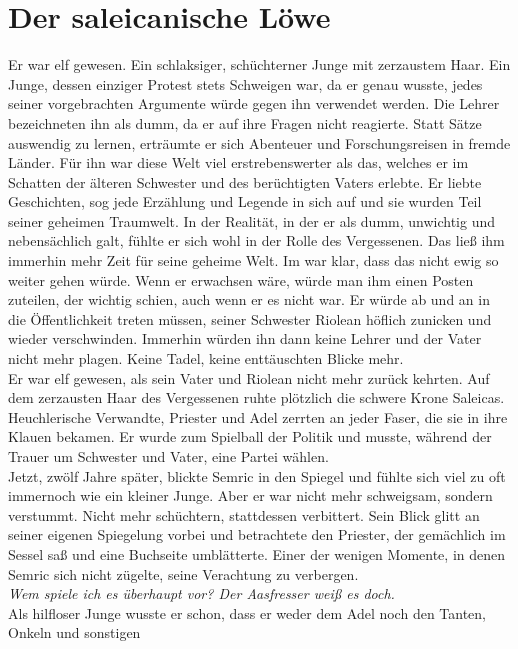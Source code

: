 
\chapter{Der saleicanische Löwe}
Er war elf gewesen. Ein schlaksiger, schüchterner Junge mit zerzaustem Haar. Ein Junge, dessen 
einziger Protest stets Schweigen war, da er genau wusste, jedes seiner vorgebrachten Argumente würde 
gegen ihn verwendet werden. Die Lehrer bezeichneten ihn als dumm, da er auf ihre Fragen nicht 
reagierte. Statt Sätze auswendig zu lernen, erträumte er sich Abenteuer und Forschungsreisen in 
fremde Länder. Für ihn war diese Welt viel erstrebenswerter als das, welches er im Schatten der 
älteren Schwester und des berüchtigten Vaters erlebte. Er liebte Geschichten, sog jede Erzählung und 
Legende in sich auf und sie wurden Teil seiner geheimen Traumwelt. In der Realität, in der er als 
dumm, unwichtig und nebensächlich galt, fühlte er sich wohl in der Rolle des Vergessenen. Das ließ 
ihm immerhin mehr Zeit für seine geheime Welt. Im war klar, dass das nicht ewig so weiter gehen 
würde. Wenn er erwachsen wäre, würde man ihm einen Posten zuteilen, der wichtig schien, auch wenn er 
es nicht war. Er würde ab und an in die Öffentlichkeit treten müssen, seiner Schwester Riolean 
höflich zunicken und wieder verschwinden. Immerhin würden ihn dann keine Lehrer und der Vater nicht 
mehr plagen. Keine Tadel, keine enttäuschten Blicke mehr.\\
Er war elf gewesen, als sein Vater und Riolean nicht mehr zurück kehrten. Auf dem zerzausten Haar 
des Vergessenen ruhte plötzlich die schwere Krone Saleicas. Heuchlerische Verwandte, Priester und 
Adel zerrten an jeder Faser, die sie in ihre Klauen bekamen. Er wurde zum Spielball der Politik und 
musste, während der Trauer um Schwester und Vater, eine Partei wählen.\\
Jetzt, zwölf Jahre später, blickte Semric in den Spiegel und fühlte sich viel zu oft immernoch wie 
ein kleiner Junge. Aber er war nicht mehr schweigsam, sondern verstummt. Nicht mehr schüchtern, 
stattdessen verbittert. Sein Blick glitt an seiner eigenen Spiegelung vorbei und betrachtete den 
Priester, der gemächlich im Sessel saß und eine Buchseite umblätterte. Einer der wenigen Momente, 
in denen Semric sich nicht zügelte, seine Verachtung zu verbergen. \\
\textit{Wem spiele ich es überhaupt vor? Der Aasfresser weiß es doch.}\\
Als hilfloser Junge wusste er schon, dass er weder dem Adel noch den Tanten, Onkeln und sonstigen 
